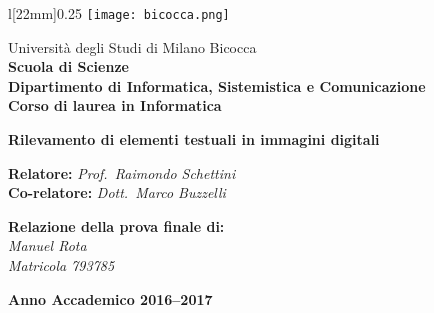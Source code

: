 \begin{onehalfspace}
	\begin{wrapfigure}[4]{l}[22mm]{0.25\textwidth}
		\vspace*{-7mm}
		\centering
		\texttt{[image: bicocca.png]}
	\end{wrapfigure}
	\par
	Università degli Studi di Milano Bicocca \\
	\textbf{Scuola di Scienze \\
			Dipartimento di Informatica, Sistemistica e Comunicazione \\
			Corso di laurea in Informatica}
\end{onehalfspace}

\vfill
\par

\begin{doublespace}
\begin{center}
	{\Huge \textbf{Rilevamento di elementi testuali in immagini digitali}}
\end{center}
\end{doublespace}

\vfill
\par

\begin{onehalfspace}
\begin{flushleft}
	{\large \textbf{Relatore:} \textit{Prof.\ Raimondo Schettini} \\
	\textbf{Co-relatore:} \textit{Dott.\ Marco Buzzelli}}
\end{flushleft}

\vspace{8mm}
\par

\begin{flushright}
	{\large \textbf{Relazione della prova finale di:} \\
			\textit{Manuel Rota \\ Matricola 793785}}
\end{flushright}
\end{onehalfspace}

\vfill
\par

\begin{center}
	{\large \textbf{Anno Accademico 2016--2017}}
\end{center}

